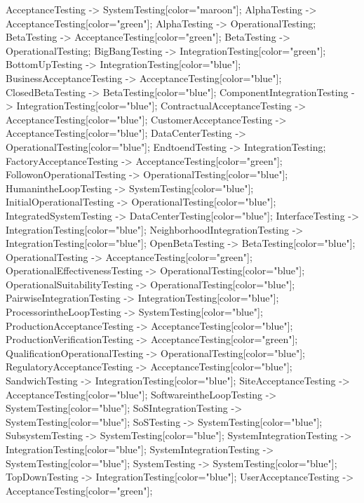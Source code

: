 \documentclass{article}
\begin{document}
{AcceptanceTesting -> SystemTesting[color="maroon"];
AlphaTesting -> AcceptanceTesting[color="green"];
AlphaTesting -> OperationalTesting;
BetaTesting -> AcceptanceTesting[color="green"];
BetaTesting -> OperationalTesting;
BigBangTesting -> IntegrationTesting[color="green"];
BottomUpTesting -> IntegrationTesting[color="blue"];
BusinessAcceptanceTesting -> AcceptanceTesting[color="blue"];
ClosedBetaTesting -> BetaTesting[color="blue"];
ComponentIntegrationTesting -> IntegrationTesting[color="blue"];
ContractualAcceptanceTesting -> AcceptanceTesting[color="blue"];
CustomerAcceptanceTesting -> AcceptanceTesting[color="blue"];
DataCenterTesting -> OperationalTesting[color="blue"];
EndtoendTesting -> IntegrationTesting;
FactoryAcceptanceTesting -> AcceptanceTesting[color="green"];
FollowonOperationalTesting -> OperationalTesting[color="blue"];
HumanintheLoopTesting -> SystemTesting[color="blue"];
InitialOperationalTesting -> OperationalTesting[color="blue"];
IntegratedSystemTesting -> DataCenterTesting[color="blue"];
InterfaceTesting -> IntegrationTesting[color="blue"];
NeighborhoodIntegrationTesting -> IntegrationTesting[color="blue"];
OpenBetaTesting -> BetaTesting[color="blue"];
OperationalTesting -> AcceptanceTesting[color="green"];
OperationalEffectivenessTesting -> OperationalTesting[color="blue"];
OperationalSuitabilityTesting -> OperationalTesting[color="blue"];
PairwiseIntegrationTesting -> IntegrationTesting[color="blue"];
ProcessorintheLoopTesting -> SystemTesting[color="blue"];
ProductionAcceptanceTesting -> AcceptanceTesting[color="blue"];
ProductionVerificationTesting -> AcceptanceTesting[color="green"];
QualificationOperationalTesting -> OperationalTesting[color="blue"];
RegulatoryAcceptanceTesting -> AcceptanceTesting[color="blue"];
SandwichTesting -> IntegrationTesting[color="blue"];
SiteAcceptanceTesting -> AcceptanceTesting[color="blue"];
SoftwareintheLoopTesting -> SystemTesting[color="blue"];
SoSIntegrationTesting -> SystemTesting[color="blue"];
SoSTesting -> SystemTesting[color="blue"];
SubsystemTesting -> SystemTesting[color="blue"];
SystemIntegrationTesting -> IntegrationTesting[color="blue"];
SystemIntegrationTesting -> SystemTesting[color="blue"];
SystemTesting -> SystemTesting[color="blue"];
TopDownTesting -> IntegrationTesting[color="blue"];
UserAcceptanceTesting -> AcceptanceTesting[color="green"];

}
\end{document}
